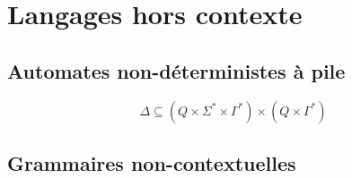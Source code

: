 \chapter{Langages hors contexte}

\section{Automates non-déterministes à pile}

\[
\Delta \subseteq (Q \times \Sigma^* \times \Gamma^*) \times (Q \times \Gamma^*)
\]

\section{Grammaires non-contextuelles}
